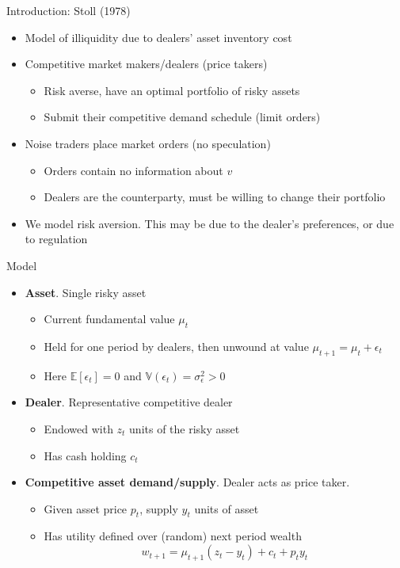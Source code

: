 \documentclass[english,10pt
,aspectratio=169
]{beamer}
\begin{document}
\begin{frame}{Introduction: Stoll (1978)}
	\begin{itemize}
		\item Model of illiquidity due to dealers' asset inventory cost
		\item Competitive market makers/dealers (price takers)
		\begin{itemize}
			\item Risk averse, have an optimal portfolio of risky assets
			\item Submit their competitive demand schedule (limit orders)
		\end{itemize}
		\item Noise traders place market orders (no speculation)
		\begin{itemize}
			\item Orders contain no information about $v$
			\item Dealers are the counterparty, must be willing to change their portfolio
		\end{itemize}
		\item We model risk aversion. This may be due to the dealer's preferences, or due to regulation
	\end{itemize}
\end{frame}


\begin{frame}{Model}
	\begin{itemize}
		\item \textbf{Asset}. Single risky asset
		\begin{itemize}
			\item Current fundamental value $\mu_t$
			\item Held for one period by dealers, then unwound at value $\mu_{t+1}=\mu_t + \epsilon_t$
			\item Here $\mathbb{E}[\epsilon_t] = 0$ and $\mathbb{V}(\epsilon_{t})=\sigma^2_\epsilon > 0$
		\end{itemize}
		\item \textbf{Dealer}. Representative competitive dealer
		\begin{itemize}
			\item Endowed with $z_t$ units of the risky asset
			\item Has cash holding $c_t$
		\end{itemize}
		\item \textbf{Competitive asset demand/supply}. Dealer acts as price taker.
		\begin{itemize}
			\item Given asset price $p_t$, supply $y_t$ units of asset
			\item Has utility defined over (random) next period wealth
			\[
			w_{t+1} = \mu_{t+1}(z_t - y_t) + c_t + p_t y_t
			\]
		\end{itemize}
	\end{itemize}
\end{frame}
\end{document}
